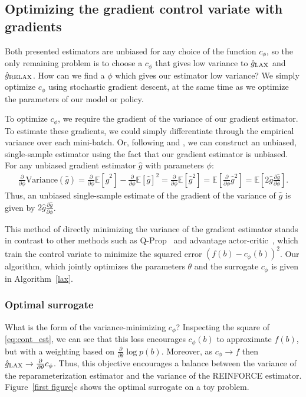 \documentclass{article}
\newcommand{\E}{\mathbb{E}}
\newcommand{\PT}{\frac{\partial}{\partial \theta}}
\newcommand{\PPH}{\frac{\partial}{\partial \phi}}
\newcommand{\LAX}{{\textnormal{LAX}}}
\newcommand{\RELAX}{{\textnormal{RELAX}}}
\begin{document}
\subsection{Optimizing the gradient control variate with gradients}
Both presented estimators are unbiased for any choice of the function $c_\phi$, so the only remaining problem is to choose a $c_\phi$ that gives low variance to $\hat g_\LAX$ and $\hat g_\RELAX{}$.
How can we find a $\phi$ which gives our estimator low variance?
We simply optimize $c_\phi$ using stochastic gradient descent, at the same time as we optimize the parameters of our model or policy.

To optimize $c_\phi$, we require the gradient of the variance of our gradient estimator.
To estimate these gradients, we could simply differentiate through the empirical variance over each mini-batch.
Or, following \cite{tucker2017rebar} and \cite{ruiz2016overdispersed}, we can construct an unbiased, single-sample estimator using the fact that our gradient estimator is unbiased.
For any unbiased gradient estimator $\hat g$ with parameters $\phi$:
%
\begin{align}
\PPH \text{Variance}(\hat g)
= \PPH \E[\hat g^2] - \PPH \E[\hat g]^2
= \PPH \E[\hat g^2]
= \E \left[ \PPH \hat g^2 \right]
= \E \left[ 2 \hat g \frac{\partial \hat g}{\partial \phi} \right].
\label{eq:vargrad}
\end{align}  %
%
Thus, an unbiased single-sample estimate of the gradient of the variance of $\hat g$ is given by {$2 \hat g \frac{\partial \hat g}{\partial \phi}$}.

This method of directly minimizing the variance of the gradient estimator stands in contrast to other methods such as Q-Prop~\citep{gu2016q} and advantage actor-critic~\citep{mnih2016asynchronous}, which train the control variate to minimize the squared error $(f(b) - c_\phi(b))^2$.
Our algorithm, which jointly optimizes the parameters $\theta$ and the surrogate $c_\phi$ is given in Algorithm~\ref{lax}.

\subsubsection{Optimal surrogate}
What is the form of the variance-minimizing $c_\phi$?
Inspecting the square of \eqref{eq:cont_est}, we can see that this loss encourages $c_\phi(b)$ to approximate $f(b)$, but with a weighting based on $\PT\log p(b)$.  %
Moreover, as $c_\phi \rightarrow f$ then $\hat g_\textnormal{\LAX} \rightarrow \PT c_\phi$.
Thus, this objective encourages a balance between the variance of the reparameterization estimator and the variance of the REINFORCE estimator.
Figure~\ref{first figure}c shows the optimal surrogate on a toy problem.
\end{document}
